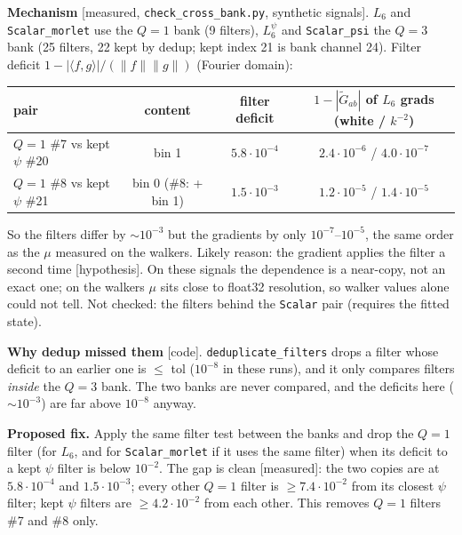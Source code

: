 \documentclass[11pt,a4paper]{article}
\begin{document}
\textbf{Mechanism} [measured, \texttt{check\_cross\_bank.py}, synthetic signals]. $L_6$ and \texttt{Scalar\_morlet}
use the $Q=1$ bank (9 filters), $L_6^\psi$ and \texttt{Scalar\_psi} the $Q=3$ bank (25 filters, 22 kept by dedup;
kept index 21 is bank channel 24). Filter deficit $1-|\langle f,g\rangle|/(\|f\|\|g\|)$ (Fourier domain):
\begin{center}\small\begin{tabular}{lccc}\toprule
pair & content & filter deficit & $1-|\tilde G_{ab}|$ of $L_6$ grads (white / $k^{-2}$)\\\midrule
$Q{=}1$ \#7 vs kept $\psi$ \#20 & bin 1 & $5.8\cdot10^{-4}$ & $2.4\cdot10^{-6}$ / $4.0\cdot10^{-7}$\\
$Q{=}1$ \#8 vs kept $\psi$ \#21 & bin 0 (\#8: + bin 1) & $1.5\cdot10^{-3}$ & $1.2\cdot10^{-5}$ / $1.4\cdot10^{-5}$\\\bottomrule
\end{tabular}\end{center}
So the filters differ by $\sim10^{-3}$ but the gradients by only $10^{-7}$--$10^{-5}$, the same order as the
$\mu$ measured on the walkers. Likely reason: the gradient applies the filter a second time
[hypothesis]. On these signals the dependence is a near-copy, not an exact one; on the walkers
$\mu$ sits close to float32 resolution, so walker values alone could not tell. Not checked: the
filters behind the \texttt{Scalar} pair (requires the fitted state).

\textbf{Why dedup missed them} [code]. \texttt{deduplicate\_filters} drops a filter whose deficit to an
earlier one is $\le$ tol ($10^{-8}$ in these runs), and it only compares filters \emph{inside} the $Q=3$ bank.
The two banks are never compared, and the deficits here ($\sim10^{-3}$) are far above $10^{-8}$ anyway.

\textbf{Proposed fix.} Apply the same filter test between the banks and drop the $Q=1$ filter (for $L_6$,
and for \texttt{Scalar\_morlet} if it uses the same filter) when its deficit to a kept $\psi$ filter is below
$10^{-2}$. The gap is clean [measured]: the two copies are at $5.8\cdot10^{-4}$ and $1.5\cdot10^{-3}$; every other
$Q{=}1$ filter is $\ge7.4\cdot10^{-2}$ from its closest $\psi$ filter; kept $\psi$ filters are $\ge4.2\cdot10^{-2}$
from each other. This removes $Q{=}1$ filters \#7 and \#8 only.
\end{document}
